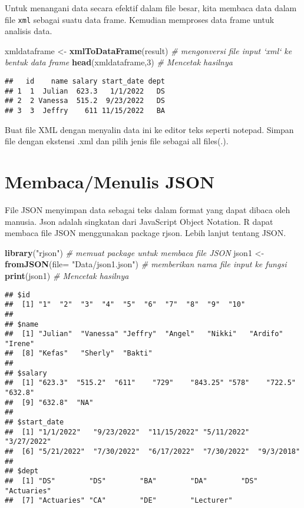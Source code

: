 \documentclass[
]{book}
\newenvironment{Shaded}{\begin{snugshade}}{\end{snugshade}}
\newcommand{\CommentTok}[1]{\textcolor[rgb]{0.56,0.35,0.01}{\textit{#1}}}
\newcommand{\DataTypeTok}[1]{\textcolor[rgb]{0.13,0.29,0.53}{#1}}
\newcommand{\DecValTok}[1]{\textcolor[rgb]{0.00,0.00,0.81}{#1}}
\newcommand{\KeywordTok}[1]{\textcolor[rgb]{0.13,0.29,0.53}{\textbf{#1}}}
\newcommand{\NormalTok}[1]{#1}
\newcommand{\StringTok}[1]{\textcolor[rgb]{0.31,0.60,0.02}{#1}}
\begin{document}
Untuk menangani data secara efektif dalam file besar, kita membaca data dalam file \texttt{xml} sebagai suatu data frame. Kemudian memproses data frame untuk analisis data.

\begin{Shaded}
\begin{Highlighting}[]
\NormalTok{xmldataframe <-}\StringTok{ }\KeywordTok{xmlToDataFrame}\NormalTok{(result)             }\CommentTok{# mengonversi file input `xml` ke bentuk data frame}
\KeywordTok{head}\NormalTok{(xmldataframe,}\DecValTok{3}\NormalTok{)                               }\CommentTok{# Mencetak hasilnya}
\end{Highlighting}
\end{Shaded}

\begin{verbatim}
##   id    name salary start_date dept
## 1  1  Julian  623.3   1/1/2022   DS
## 2  2 Vanessa  515.2  9/23/2022   DS
## 3  3  Jeffry    611 11/15/2022   BA
\end{verbatim}

Buat file XML dengan menyalin data ini ke editor teks seperti notepad. Simpan file dengan ekstensi .xml dan pilih jenis file sebagai all files(.).

\hypertarget{membacamenulis-json}{%
\section{Membaca/Menulis JSON}\label{membacamenulis-json}}

File JSON menyimpan data sebagai teks dalam format yang dapat dibaca oleh manusia. Json adalah singkatan dari JavaScript Object Notation. R dapat membaca file JSON menggunakan package rjson. Lebih lanjut tentang JSON.

\begin{Shaded}
\begin{Highlighting}[]
\KeywordTok{library}\NormalTok{(}\StringTok{"rjson"}\NormalTok{)                                   }\CommentTok{# memuat package untuk membaca file JSON}
\NormalTok{json1 <-}\StringTok{ }\KeywordTok{fromJSON}\NormalTok{(}\DataTypeTok{file=} \StringTok{"Data/json1.json"}\NormalTok{)         }\CommentTok{# memberikan nama file input ke fungsi}
\KeywordTok{print}\NormalTok{(json1)                                       }\CommentTok{# Mencetak hasilnya}
\end{Highlighting}
\end{Shaded}

\begin{verbatim}
## $id
##  [1] "1"  "2"  "3"  "4"  "5"  "6"  "7"  "8"  "9"  "10"
## 
## $name
##  [1] "Julian"  "Vanessa" "Jeffry"  "Angel"   "Nikki"   "Ardifo"  "Irene"  
##  [8] "Kefas"   "Sherly"  "Bakti"  
## 
## $salary
##  [1] "623.3"  "515.2"  "611"    "729"    "843.25" "578"    "722.5"  "632.8" 
##  [9] "632.8"  "NA"    
## 
## $start_date
##  [1] "1/1/2022"   "9/23/2022"  "11/15/2022" "5/11/2022"  "3/27/2022" 
##  [6] "5/21/2022"  "7/30/2022"  "6/17/2022"  "7/30/2022"  "9/3/2018"  
## 
## $dept
##  [1] "DS"        "DS"        "BA"        "DA"        "DS"        "Actuaries"
##  [7] "Actuaries" "CA"        "DE"        "Lecturer"
\end{verbatim}
\end{document}
